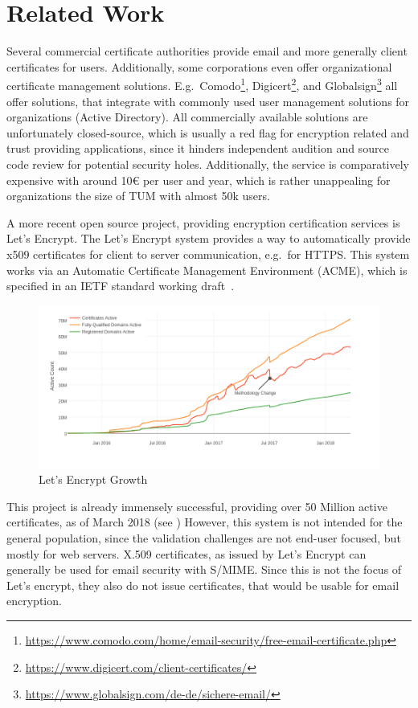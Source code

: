 \chapter{Related Work}\label{ch:relatedWork}
Several commercial certificate authorities provide email and more generally client certificates for users.
Additionally, some corporations even offer organizational certificate management solutions.
E.g.\ Comodo\footnote{\url{https://www.comodo.com/home/email-security/free-email-certificate.php}},
Digicert\footnote{\url{https://www.digicert.com/client-certificates/}}, and
Globalsign\footnote{\url{https://www.globalsign.com/de-de/sichere-email/}} all offer solutions, that integrate with
commonly used user management solutions for organizations (Active Directory).
All commercially available solutions are unfortunately closed-source, which is usually a red flag for encryption related
and trust providing applications, since it hinders independent audition and source code review for potential security
holes.
Additionally, the service is comparatively expensive with around 10€ per user and year, which is rather unappealing for
organizations the size of TUM with almost 50k users.

A more recent open source project, providing encryption certification services is Let's Encrypt.
The Let's Encrypt system provides a way to automatically provide x509 certificates for client to server communication,
e.g.\ for HTTPS\@.
This system works via an Automatic Certificate Management Environment (ACME), which is specified in an IETF standard
working draft~\cite{letsencrypteacme}.

\begin{figure}[hb]
    \centering
    \includegraphics[width=.675\textwidth]{figures/letsencryptusers.png}
    \caption{Let's Encrypt Growth~\cite{letsencryptstats}}
    \label{fig:letsencrypt}
\end{figure}

This project is already immensely successful, providing over 50 Million active certificates, as of March 2018 (see
)
However, this system is not intended for the general population, since the validation challenges are not end-user
focused, but mostly for web servers.
X.509 certificates, as issued by Let's Encrypt can generally be used for email security with S/MIME\@.
Since this is not the focus of Let's encrypt, they also do not issue certificates, that would be usable for email
encryption.

